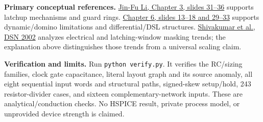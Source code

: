 \documentclass[10pt]{article}
\begin{document}
\textbf{Primary conceptual references.} \href{https://www.ee.ncu.edu.tw/jfli/public_html/VLSI/lecture/ch03.pdf}{Jin-Fu Li, Chapter 3, slides 31--36} supports latchup mechanisms and guard rings. \href{https://www.ee.ncu.edu.tw/jfli/public_html/VLSI/lecture/ch06.pdf}{Chapter 6, slides 13--18 and 29--33} supports dynamic/domino limitations and differential/DSL structures. \href{https://users.cs.utah.edu/~rajeev/cs7810/papers/shivakumar02.pdf}{Shivakumar et al., DSN 2002} analyzes electrical and latching-window masking trends; the explanation above distinguishes those trends from a universal scaling claim.

\textbf{Verification and limits.} Run \texttt{python verify.py}. It verifies the RC/sizing families, clock gate capacitance, literal layout graph and its source anomaly, all eight sequential input words and structural paths, signed-skew setup/hold, 243 resistor-divider cases, and sixteen complementary-network inputs. These are analytical/conduction checks. No HSPICE result, private process model, or unprovided device strength is claimed.
\end{document}

